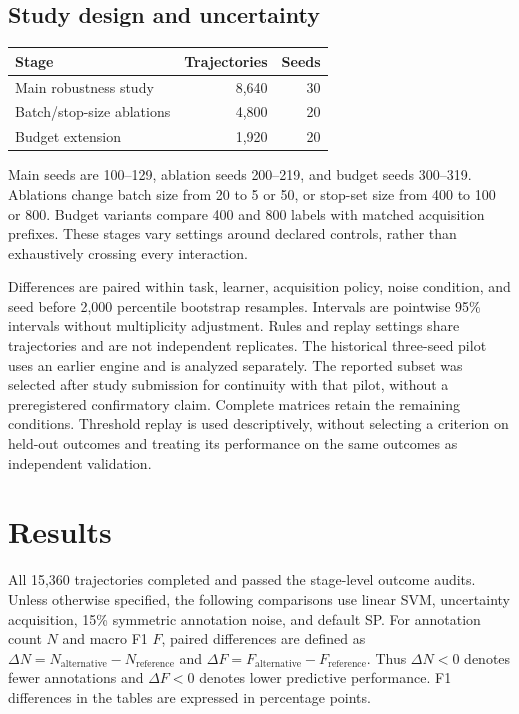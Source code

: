 \documentclass[10pt,twocolumn]{article}
\begin{document}
\subsection{Study design and uncertainty}
\begin{center}
\begin{tabular}{lrr}
\toprule
Stage & Trajectories & Seeds\\
\midrule
Main robustness study & 8,640 & 30\\
Batch/stop-size ablations & 4,800 & 20\\
Budget extension & 1,920 & 20\\
\bottomrule
\end{tabular}
\end{center}
Main seeds are 100--129, ablation seeds 200--219, and budget seeds 300--319. Ablations change batch size from 20 to 5 or 50, or stop-set size from 400 to 100 or 800. Budget variants compare 400 and 800 labels with matched acquisition prefixes. These stages vary settings around declared controls, rather than exhaustively crossing every interaction.

Differences are paired within task, learner, acquisition policy, noise condition, and seed before 2,000 percentile bootstrap resamples. Intervals are pointwise 95\% intervals without multiplicity adjustment. Rules and replay settings share trajectories and are not independent replicates. The historical three-seed pilot uses an earlier engine and is analyzed separately. The reported subset was selected after study submission for continuity with that pilot, without a preregistered confirmatory claim. Complete matrices retain the remaining conditions. Threshold replay is used descriptively, without selecting a criterion on held-out outcomes and treating its performance on the same outcomes as independent validation.

\section{Results}
All 15,360 trajectories completed and passed the stage-level outcome audits. Unless otherwise specified, the following comparisons use linear SVM, uncertainty acquisition, 15\% symmetric annotation noise, and default SP. For annotation count $N$ and macro F1 $F$, paired differences are defined as $\Delta N=N_{\mathrm{alternative}}-N_{\mathrm{reference}}$ and $\Delta F=F_{\mathrm{alternative}}-F_{\mathrm{reference}}$. Thus $\Delta N<0$ denotes fewer annotations and $\Delta F<0$ denotes lower predictive performance. F1 differences in the tables are expressed in percentage points.
\end{document}

